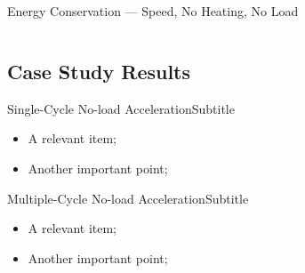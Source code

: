 \begin{frame}{Energy Conservation --- Speed, No Heating, No Load}
\begin{columns}
        \vspace*{-4mm}%

        \end{columns}
    \end{frame}
\subsection{Case Study Results}

    \begin{frame}{Single-Cycle No-load Acceleration}{Subtitle}\vspace*{-2em}
        \begin{itemize}
            \item<2->  A \alert{relevant} item;
            \item<3->  Another \alert{important} point;
        \end{itemize}
    \end{frame}

    \begin{frame}{Multiple-Cycle No-load Acceleration}{Subtitle}\vspace*{-2em}
        \begin{itemize}
            \item<2->  A \alert{relevant} item;
            \item<3->  Another \alert{important} point;
        \end{itemize}
    \end{frame}

